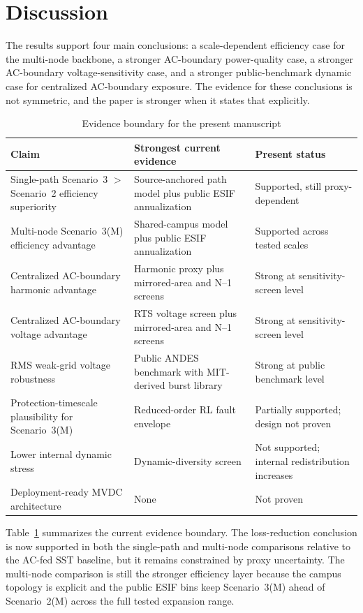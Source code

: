 \documentclass[11pt]{article}
\begin{document}
\section{Discussion}
The results support four main conclusions: a scale-dependent efficiency case for the multi-node backbone, a stronger AC-boundary power-quality case, a stronger AC-boundary voltage-sensitivity case, and a stronger public-benchmark dynamic case for centralized AC-boundary exposure. The evidence for these conclusions is not symmetric, and the paper is stronger when it states that explicitly.

\begin{table}[t]
    \centering
    \caption{Evidence boundary for the present manuscript}
    \label{tab:evidenceboundary}
    \begin{tabular}{p{2.15in}p{1.7in}p{1.65in}}
        \toprule
        Claim & Strongest current evidence & Present status \\
        \midrule
        Single-path Scenario~3 $>$ Scenario~2 efficiency superiority & Source-anchored path model plus public ESIF annualization & Supported, still proxy-dependent \\
        Multi-node Scenario~3(M) efficiency advantage & Shared-campus model plus public ESIF annualization & Supported across tested scales \\
        Centralized AC-boundary harmonic advantage & Harmonic proxy plus mirrored-area and N--1 screens & Strong at sensitivity-screen level \\
        Centralized AC-boundary voltage advantage & RTS voltage screen plus mirrored-area and N--1 screens & Strong at sensitivity-screen level \\
        RMS weak-grid voltage robustness & Public ANDES benchmark with MIT-derived burst library & Strong at public benchmark level \\
        Protection-timescale plausibility for Scenario~3(M) & Reduced-order RL fault envelope & Partially supported; design not proven \\
        Lower internal dynamic stress & Dynamic-diversity screen & Not supported; internal redistribution increases \\
        Deployment-ready MVDC architecture & None & Not proven \\
        \bottomrule
    \end{tabular}
\end{table}

Table~\ref{tab:evidenceboundary} summarizes the current evidence boundary. The loss-reduction conclusion is now supported in both the single-path and multi-node comparisons relative to the AC-fed SST baseline, but it remains constrained by proxy uncertainty. The multi-node comparison is still the stronger efficiency layer because the campus topology is explicit and the public ESIF bins keep Scenario~3(M) ahead of Scenario~2(M) across the full tested expansion range.
\end{document}
